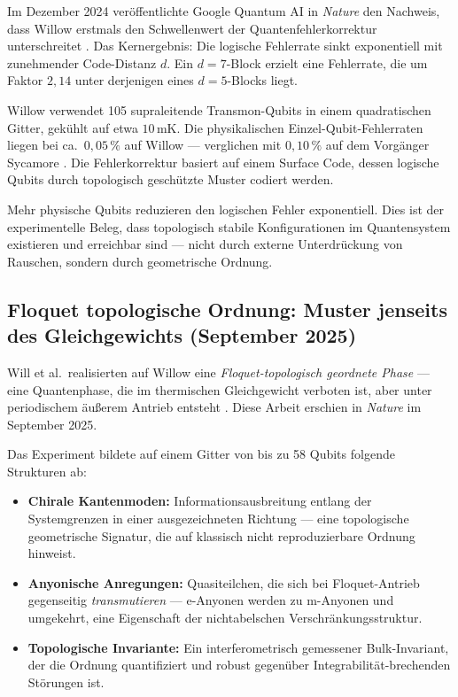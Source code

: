Im Dezember 2024 veröffentlichte Google Quantum AI in \textit{Nature} den Nachweis,
dass Willow erstmals den Schwellenwert der Quantenfehlerkorrektur unterschreitet
\cite{GoogleWillow2024}. Das Kernergebnis: Die logische Fehlerrate sinkt
exponentiell mit zunehmender Code-Distanz $d$. Ein $d=7$-Block erzielt eine
Fehlerrate, die um Faktor $2{,}14$ unter derjenigen eines $d=5$-Blocks liegt.

Willow verwendet 105 supraleitende Transmon-Qubits in einem quadratischen Gitter,
gekühlt auf etwa $10\,\text{mK}$. Die physikalischen Einzel-Qubit-Fehlerraten
liegen bei ca.\ $0{,}05\,\%$ auf Willow — verglichen mit $0{,}10\,\%$ auf dem
Vorgänger Sycamore \cite{Will2025PubMed}. Die Fehlerkorrektur basiert auf einem
Surface Code, dessen logische Qubits durch topologisch geschützte Muster codiert
werden.

\begin{keypoint}
Mehr physische Qubits reduzieren den logischen Fehler exponentiell. Dies ist der
experimentelle Beleg, dass topologisch stabile Konfigurationen im Quantensystem
existieren und erreichbar sind — nicht durch externe Unterdrückung von Rauschen,
sondern durch geometrische Ordnung.
\end{keypoint}

\subsection{Floquet topologische Ordnung: Muster jenseits des Gleichgewichts
(September 2025)}

Will et al.\ realisierten auf Willow eine \emph{Floquet-topologisch geordnete Phase}
— eine Quantenphase, die im thermischen Gleichgewicht verboten ist, aber unter
periodischem äußerem Antrieb entsteht \cite{Will2025Nature}. Diese Arbeit erschien
in \textit{Nature} im September 2025.

\begin{keyresult}
Das Experiment bildete auf einem Gitter von bis zu 58 Qubits folgende Strukturen ab:
\begin{itemize}
    \item \textbf{Chirale Kantenmoden:} Informationsausbreitung entlang der
    Systemgrenzen in einer ausgezeichneten Richtung — eine topologische geometrische
    Signatur, die auf klassisch nicht reproduzierbare Ordnung hinweist.
    \item \textbf{Anyonische Anregungen:} Quasiteilchen, die sich bei Floquet-Antrieb
    gegenseitig \emph{transmutieren} — e-Anyonen werden zu m-Anyonen und umgekehrt,
    eine Eigenschaft der nichtabelschen Verschränkungsstruktur.
    \item \textbf{Topologische Invariante:} Ein interferometrisch gemessener
    Bulk-Invariant, der die Ordnung quantifiziert und robust gegenüber
    Integrabilität-brechenden Störungen ist.
\end{itemize}
\end{keyresult}

